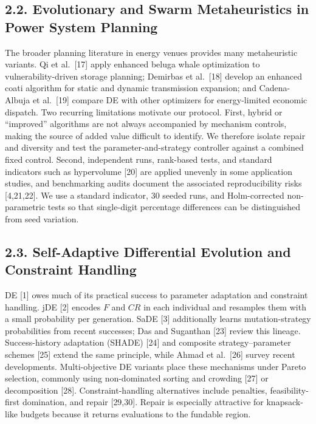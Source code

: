 \documentclass[
  10pt,
  a4paper,
]{article}
\begin{document}
\subsection{2.2. Evolutionary and Swarm Metaheuristics in Power System
Planning}\label{evolutionary-and-swarm-metaheuristics-in-power-system-planning}

The broader planning literature in energy venues provides many
metaheuristic variants. Qi et al.~{[}17{]} apply enhanced beluga whale
optimization to vulnerability-driven storage planning; Demirbas et
al.~{[}18{]} develop an enhanced coati algorithm for static and dynamic
transmission expansion; and Cadena-Albuja et al.~{[}19{]} compare DE
with other optimizers for energy-limited economic dispatch. Two
recurring limitations motivate our protocol. First, hybrid or
``improved'' algorithms are not always accompanied by mechanism
controls, making the source of added value difficult to identify. We
therefore isolate repair and diversity and test the
parameter-and-strategy controller against a combined fixed control.
Second, independent runs, rank-based tests, and standard indicators such
as hypervolume {[}20{]} are applied unevenly in some application
studies, and benchmarking audits document the associated reproducibility
risks {[}4,21,22{]}. We use a standard indicator, 30 seeded runs, and
Holm-corrected non-parametric tests so that single-digit percentage
differences can be distinguished from seed variation.

\subsection{2.3. Self-Adaptive Differential Evolution and Constraint
Handling}\label{self-adaptive-differential-evolution-and-constraint-handling}

DE {[}1{]} owes much of its practical success to parameter adaptation
and constraint handling. jDE {[}2{]} encodes \(F\) and \(CR\) in each
individual and resamples them with a small probability per generation.
SaDE {[}3{]} additionally learns mutation-strategy probabilities from
recent successes; Das and Suganthan {[}23{]} review this lineage.
Success-history adaptation (SHADE) {[}24{]} and composite
strategy--parameter schemes {[}25{]} extend the same principle, while
Ahmad et al.~{[}26{]} survey recent developments. Multi-objective DE
variants place these mechanisms under Pareto selection, commonly using
non-dominated sorting and crowding {[}27{]} or decomposition {[}28{]}.
Constraint-handling alternatives include penalties, feasibility-first
domination, and repair {[}29,30{]}. Repair is especially attractive for
knapsack-like budgets because it returns evaluations to the fundable
region.
\end{document}

